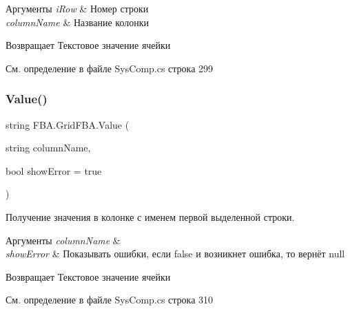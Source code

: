 \begin{DoxyParams}{Аргументы}
{\em i\+Row} & Номер строки\\
\hline
{\em column\+Name} & Название колонки\\
\hline
\end{DoxyParams}
\begin{DoxyReturn}{Возвращает}
Текстовое значение ячейки
\end{DoxyReturn}


См. определение в файле Sys\+Comp.\+cs строка 299

\mbox{\label{class_f_b_a_1_1_grid_f_b_a_a71050c522a62ec9295152323af632fcc}} 
\subsubsection{\texorpdfstring{Value()}{Value()}\hspace{0.1cm}{\footnotesize\ttfamily [3/4]}}
{\footnotesize\ttfamily string F\+B\+A.\+Grid\+F\+B\+A.\+Value (\begin{DoxyParamCaption}\item[{string}]{column\+Name,  }\item[{bool}]{show\+Error = {\ttfamily true} }\end{DoxyParamCaption})}



Получение значения в колонке с именем первой выделенной строки. 


\begin{DoxyParams}{Аргументы}
{\em column\+Name} & \\
\hline
{\em show\+Error} & Показывать ошибки, если false и возникнет ошибка, то вернёт null\\
\hline
\end{DoxyParams}
\begin{DoxyReturn}{Возвращает}
Текстовое значение ячейки
\end{DoxyReturn}


См. определение в файле Sys\+Comp.\+cs строка 310

\mbox{\label{class_f_b_a_1_1_grid_f_b_a_a8b226bc27fbabf8371d76debeb1d9ce9}} 
